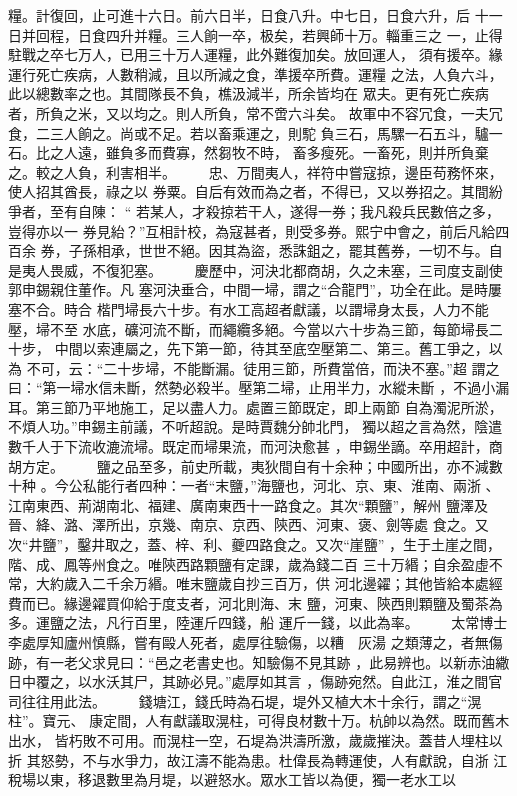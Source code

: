 \documentclass{ctexart}
\begin{document}
糧。計復回，止可進十六日。前六日半，日食八升。中七日，日食六升，后 十一日并回程，日食四升并糧。三人餉一卒，极矣，若興師十万。輜重三之 一，止得駐戰之卒七万人，已用三十万人運糧，此外難復加矣。放回運人， 須有援卒。緣運行死亡疾病，人數稍減，且以所減之食，準援卒所費。運糧 之法，人負六斗，此以總數率之也。其間隊長不負，樵汲減半，所余皆均在 眾夫。更有死亡疾病者，所負之米，又以均之。則人所負，常不啻六斗矣。 故軍中不容冗食，一夫冗食，二三人餉之。尚或不足。若以畜乘運之，則駝 負三石，馬騾一石五斗，驢一石。比之人遠，雖負多而費寡，然芻牧不時， 畜多瘦死。一畜死，則并所負棄之。較之人負，利害相半。 　　忠、万間夷人，祥符中嘗寇掠，邊臣苟務怀來，使人招其酋長，祿之以 券粟。自后有效而為之者，不得已，又以券招之。其間紛爭者，至有自陳： `` 若某人，才殺掠若干人，遂得一券；我凡殺兵民數倍之多，豈得亦以一 券見紿？''互相計校，為寇甚者，則受多券。熙宁中會之，前后凡給四百余 券，子孫相承，世世不絕。因其為盜，悉誅鉏之，罷其舊券，一切不与。自 是夷人畏威，不復犯塞。 　　慶歷中，河決北都商胡，久之未塞，三司度支副使郭申錫親住董作。凡 塞河決垂合，中間一埽，謂之``合龍門''，功全在此。是時屢塞不合。時合 楷門埽長六十步。有水工高超者獻議，以謂埽身太長，人力不能壓，埽不至 水底，礦河流不斷，而繩纜多絕。今當以六十步為三節，每節埽長二十步， 中間以索連屬之，先下第一節，待其至底空壓第二、第三。舊工爭之，以為 不可，云：``二十步埽，不能斷漏。徒用三節，所費當倍，而決不塞。''超 謂之曰：``第一埽水信未斷，然勢必殺半。壓第二埽，止用半力，水縱未斷 ，不過小漏耳。第三節乃平地施工，足以盡人力。處置三節既定，即上兩節 自為濁泥所淤，不煩人功。''申錫主前議，不听超說。是時賈魏分帥北門， 獨以超之言為然，陰遣數千人于下流收漉流埽。既定而埽果流，而河決愈甚 ，申錫坐謫。卒用超計，商胡方定。 　　鹽之品至多，前史所載，夷狄間自有十余种；中國所出，亦不減數十种 。今公私能行者四种：一者``末鹽，''海鹽也，河北、京、東、淮南、兩浙 、江南東西、荊湖南北、福建、廣南東西十一路食之。其次``顆鹽''，解州 鹽澤及晉、絳、潞、澤所出，京幾、南京、京西、陝西、河東、褒、劍等處 食之。又次``井鹽''，鑿井取之，蓋、梓、利、夔四路食之。又次``崖鹽'' ，生于土崖之間，階、成、鳳等州食之。唯陝西路顆鹽有定課，歲為錢二百 三十万緡；自余盈虛不常，大約歲入二千余万緡。唯末鹽歲自抄三百万，供 河北邊糴；其他皆給本處經費而已。緣邊糴買仰給于度支者，河北則海、末 鹽，河東、陝西則顆鹽及蜀茶為多。運鹽之法，凡行百里，陸運斤四錢，船 運斤一錢，以此為率。 　　太常博士李處厚知廬州慎縣，嘗有毆人死者，處厚往驗傷，以糟　灰湯 之類薄之，者無傷跡，有一老父求見曰：``邑之老書史也。知驗傷不見其跡 ，此易辨也。以新赤油繖日中覆之，以水沃其尸，其跡必見。''處厚如其言 ，傷跡宛然。自此江，淮之間官司往往用此法。 　　錢塘江，錢氏時為石堤，堤外又植大木十余行，謂之``滉柱''。寶元、 康定間，人有獻議取滉柱，可得良材數十万。杭帥以為然。既而舊木出水， 皆朽敗不可用。而滉柱一空，石堤為洪濤所激，歲歲摧決。蓋昔人埋柱以折 其怒勢，不与水爭力，故江濤不能為患。杜偉長為轉運使，人有獻說，自浙 江稅場以東，移退數里為月堤，以避怒水。眾水工皆以為便，獨一老水工以 
\end{document}

